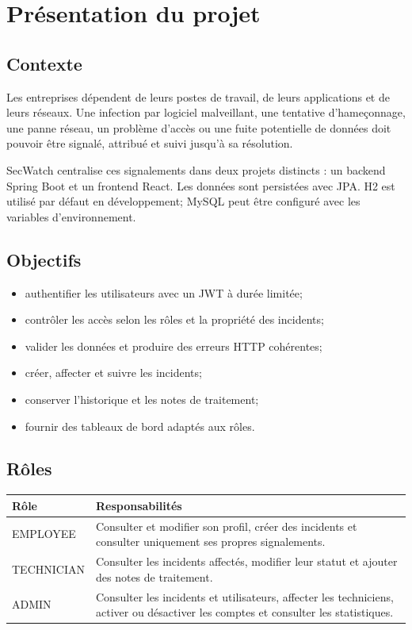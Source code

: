 \documentclass[12pt,a4paper,oneside]{report}
\begin{document}
\chapter{Présentation du projet}
\section{Contexte}
Les entreprises dépendent de leurs postes de travail, de leurs applications et de leurs réseaux. Une infection par logiciel malveillant, une tentative d'hameçonnage, une panne réseau, un problème d'accès ou une fuite potentielle de données doit pouvoir être signalé, attribué et suivi jusqu'à sa résolution.

SecWatch centralise ces signalements dans deux projets distincts : un backend Spring Boot et un frontend React. Les données sont persistées avec JPA. H2 est utilisé par défaut en développement; MySQL peut être configuré avec les variables d'environnement.

\section{Objectifs}
\begin{itemize}
  \item authentifier les utilisateurs avec un JWT à durée limitée;
  \item contrôler les accès selon les rôles et la propriété des incidents;
  \item valider les données et produire des erreurs HTTP cohérentes;
  \item créer, affecter et suivre les incidents;
  \item conserver l'historique et les notes de traitement;
  \item fournir des tableaux de bord adaptés aux rôles.
\end{itemize}

\section{Rôles}
\begin{longtable}{p{3cm}p{10.5cm}}
\toprule
\textbf{Rôle} & \textbf{Responsabilités}\\
\midrule
EMPLOYEE & Consulter et modifier son profil, créer des incidents et consulter uniquement ses propres signalements.\\
TECHNICIAN & Consulter les incidents affectés, modifier leur statut et ajouter des notes de traitement.\\
ADMIN & Consulter les incidents et utilisateurs, affecter les techniciens, activer ou désactiver les comptes et consulter les statistiques.\\
\bottomrule
\end{longtable}
\end{document}
